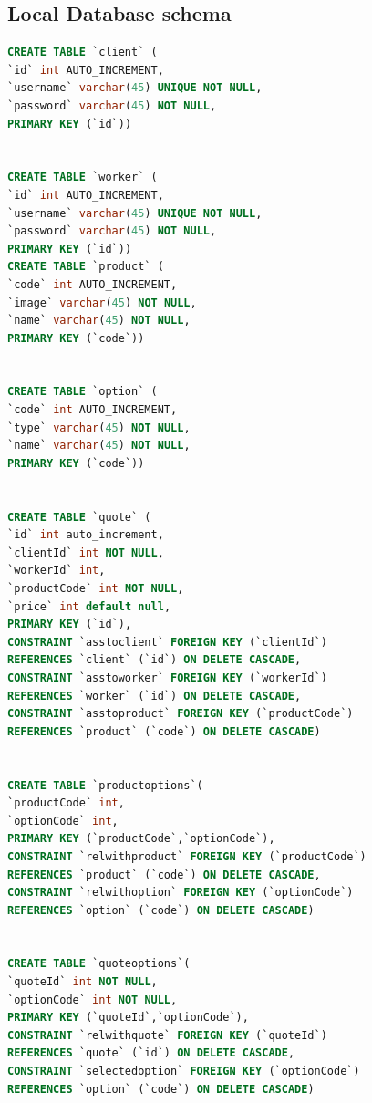 \documentclass[a4paper, 12pt]{article}
\begin{document}
\subsection{Local Database schema}
\begin{lstlisting}[language=SQL]
CREATE TABLE `client` (
`id` int AUTO_INCREMENT,
`username` varchar(45) UNIQUE NOT NULL,
`password` varchar(45) NOT NULL,
PRIMARY KEY (`id`))


CREATE TABLE `worker` (
`id` int AUTO_INCREMENT,
`username` varchar(45) UNIQUE NOT NULL,
`password` varchar(45) NOT NULL,
PRIMARY KEY (`id`))
CREATE TABLE `product` (
`code` int AUTO_INCREMENT,
`image` varchar(45) NOT NULL,
`name` varchar(45) NOT NULL,
PRIMARY KEY (`code`))


CREATE TABLE `option` (
`code` int AUTO_INCREMENT,
`type` varchar(45) NOT NULL,
`name` varchar(45) NOT NULL,
PRIMARY KEY (`code`))


CREATE TABLE `quote` (
`id` int auto_increment,
`clientId` int NOT NULL,
`workerId` int,
`productCode` int NOT NULL,
`price` int default null,
PRIMARY KEY (`id`),
CONSTRAINT `asstoclient` FOREIGN KEY (`clientId`) 
REFERENCES `client` (`id`) ON DELETE CASCADE,
CONSTRAINT `asstoworker` FOREIGN KEY (`workerId`) 
REFERENCES `worker` (`id`) ON DELETE CASCADE,
CONSTRAINT `asstoproduct` FOREIGN KEY (`productCode`) 
REFERENCES `product` (`code`) ON DELETE CASCADE)


CREATE TABLE `productoptions`(
`productCode` int,
`optionCode` int,
PRIMARY KEY (`productCode`,`optionCode`),
CONSTRAINT `relwithproduct` FOREIGN KEY (`productCode`) 
REFERENCES `product` (`code`) ON DELETE CASCADE,
CONSTRAINT `relwithoption` FOREIGN KEY (`optionCode`) 
REFERENCES `option` (`code`) ON DELETE CASCADE)


CREATE TABLE `quoteoptions`(
`quoteId` int NOT NULL,
`optionCode` int NOT NULL,
PRIMARY KEY (`quoteId`,`optionCode`),
CONSTRAINT `relwithquote` FOREIGN KEY (`quoteId`) 
REFERENCES `quote` (`id`) ON DELETE CASCADE,
CONSTRAINT `selectedoption` FOREIGN KEY (`optionCode`) 
REFERENCES `option` (`code`) ON DELETE CASCADE)
\end{lstlisting}
\end{document}

